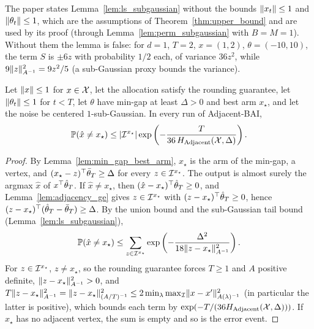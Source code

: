 \begin{remark}
  \label{rem:ls_bounds}
  The paper states Lemma~\ref{lem:ls_subgaussian} without the bounds $\lVert x_t \rVert \le 1$ and
  $\lVert \theta_t \rVert \le 1$, which are the assumptions of Theorem~\ref{thm:upper_bound} and are used
  by its proof (through Lemma~\ref{lem:perm_subgaussian} with $B = M = 1$). Without them the lemma
  is false: for $d = 1$, $T = 2$, $x = (1, 2)$, $\theta = (-10, 10)$, the term $S$ is
  $\pm 6 z$ with probability $1/2$ each, of variance $36 z^2$, while
  $9 \lVert z \rVert^2_{A^{-1}} = 9 z^2 / 5$ (a sub-Gaussian proxy bounds the variance).
\end{remark}

\begin{theorem}
  \label{thm:upper_bound}
  \leanok
  Let $\lVert x \rVert \le 1$ for $x \in \mathcal{X}$, let the allocation satisfy the rounding guarantee, let
  $\lVert \theta_t \rVert \le 1$ for $t < T$, let $\theta$ have min-gap at least $\Delta > 0$ and best arm
  $x_\star$, and let the noise be centered $1$-sub-Gaussian. In every run of Adjacent-BAI,
  \[
    \mathbb{P}(\hat x \ne x_\star) \le \lvert \mathcal{I}^{x_\star} \rvert
      \exp\left(-\frac{T}{36\, H_{\mathrm{Adjacent}}(\mathcal{X}, \Delta)}\right).
  \]
\end{theorem}

\begin{proof}
  \leanok
  By Lemma~\ref{lem:min_gap_best_arm}, $x_\star$ is the arm of the min-gap, a vertex, and
  $(x_\star - z)^\top \bar{\theta}_T \ge \Delta$ for every $z \in \mathcal{I}^{x_\star}$. The output is almost
  surely the argmax $\hat x$ of $x^\top \hat{\theta}_T$. If $\hat x \ne x_\star$, then
  $(\hat x - x_\star)^\top \hat{\theta}_T \ge 0$, and Lemma~\ref{lem:adjacency_ge} gives
  $z \in \mathcal{I}^{x_\star}$ with $(z - x_\star)^\top \hat{\theta}_T \ge 0$, hence
  $(z - x_\star)^\top (\hat{\theta}_T - \bar{\theta}_T) \ge \Delta$. By the union bound and the
  sub-Gaussian tail bound (Lemma~\ref{lem:ls_subgaussian}),
  \[
    \mathbb{P}(\hat x \ne x_\star) \le \sum_{z \in \mathcal{I}^{x_\star}}
      \exp\left(-\frac{\Delta^2}{18 \lVert z - x_\star \rVert^2_{A^{-1}}}\right).
  \]
  For $z \in \mathcal{I}^{x_\star}$, $z \ne x_\star$, so the rounding guarantee forces $T \ge 1$ and $A$
  positive definite, $\lVert z - x_\star \rVert^2_{A^{-1}} > 0$, and
  $T \lVert z - x_\star \rVert^2_{A^{-1}} = \lVert z - x_\star \rVert^2_{(A/T)^{-1}} \le 2
  \min_\lambda \max_{\mathcal{I}} \lVert x - x' \rVert^2_{A(\lambda)^{-1}}$ (in particular the latter is positive),
  which bounds each term by $\exp(-T / (36 H_{\mathrm{Adjacent}}(\mathcal{X}, \Delta)))$. If $x_\star$ has no adjacent
  vertex, the sum is empty and so is the error event.
\end{proof}


